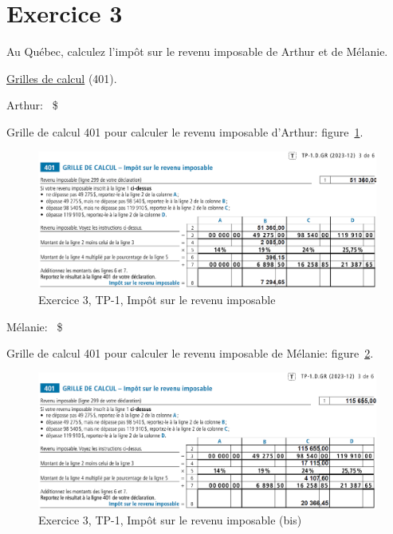 \section{Exercice 3}
\setcounter{question}{0}
\begin{question}
	Au Québec, calculez l'impôt sur le revenu imposable de Arthur et de Mélanie.
	
	\href{https://www.revenuquebec.ca/documents/fr/formulaires/tp/2023-12/TP-1.D.GR%282023-12%29.pdf}{Grilles de calcul} (401).
\end{question}
\setcounter{sousQuestion}{0}
\begin{sousQuestion}
	Arthur: ~\$
\end{sousQuestion}
Grille de calcul 401 pour calculer le revenu imposable d'Arthur: figure~\ref{fig:chap5Exercice3Q1a}.
\begin{figure}
	\centering
	\includegraphics[width=.9\textwidth]{exercice/5-3/Q1/TP1-401-Arthur.png}
	\caption[]{Exercice 3, TP-1, Impôt sur le revenu imposable}
	\label{fig:chap5Exercice3Q1a}
\end{figure}

\begin{sousQuestion}
	Mélanie: ~\$
\end{sousQuestion}
Grille de calcul 401 pour calculer le revenu imposable de Mélanie: figure~\ref{fig:chap5Exercice3Q1b}.
\begin{figure}
	\centering
	\includegraphics[width=.9\textwidth]{exercice/5-3/Q1/TP1-401-Melanie.png}
	\caption[]{Exercice 3, TP-1, Impôt sur le revenu imposable (bis)}
	\label{fig:chap5Exercice3Q1b}
\end{figure}

